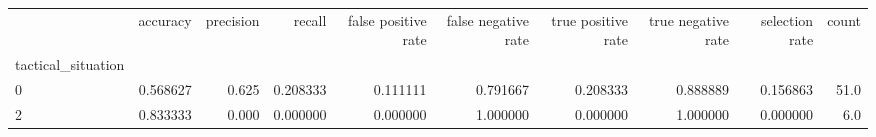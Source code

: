 \begin{tabular}{lrrrrrrrrr}
\toprule
{} &  accuracy &  precision &    recall &  false positive rate &  false negative rate &  true positive rate &  true negative rate &  selection rate &  count \\
tactical\_situation &           &            &           &                      &                      &                     &                     &                 &        \\
\midrule
0                  &  0.568627 &      0.625 &  0.208333 &             0.111111 &             0.791667 &            0.208333 &            0.888889 &        0.156863 &   51.0 \\
2                  &  0.833333 &      0.000 &  0.000000 &             0.000000 &             1.000000 &            0.000000 &            1.000000 &        0.000000 &    6.0 \\
\bottomrule
\end{tabular}
